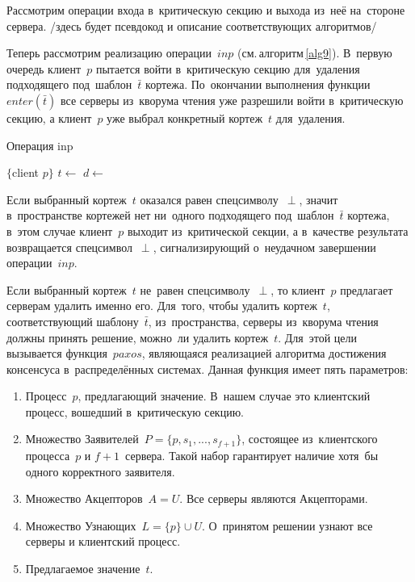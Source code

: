 Рассмотрим операции входа в~критическую секцию и выхода из~неё на~стороне сервера. /здесь будет псевдокод и описание соответствующих алгоритмов/

Теперь рассмотрим реализацию операции~$inp$ (см.\,алгоритм\,\ref{alg9}). В~первую очередь клиент~$p$ пытается войти в~критическую секцию для~удаления подходящего под~шаблон~$\bar t$ кортежа. По~окончании выполнения функции~$enter(\bar t)$ все серверы из~кворума чтения уже разрешили войти в~критическую секцию, а клиент~$p$ уже выбрал конкретный кортеж~$t$ для~удаления.

\begin{algorithm}[H]
	\caption{Операция inp}\label{alg9}
	\begin{algorithmic}[1]
		\Statex $\{$client $p \}$
		\Repeat
			\State $t \gets$ 
				\State {}
				\State \Return{$\perp$}
			\EndIf
			\State $d \gets$ 
			\State {}
		\State {}
		\EndFunction
	\end{algorithmic}
\end{algorithm}

Если выбранный кортеж~$t$ оказался равен спецсимволу~$\perp$, значит в~пространстве кортежей нет ни~одного подходящего под~шаблон~$\bar t$ кортежа, в~этом случае клиент~$p$ выходит из~критической секции, а в~качестве результата возвращается спецсимвол~$\perp$, сигнализирующий о~неудачном завершении операции~$inp$.

Если выбранный кортеж~$t$ не~равен спецсимволу~$\perp$, то клиент~$p$ предлагает серверам удалить именно его. Для~того, чтобы удалить кортеж~$t$, соответствующий шаблону~$\bar{t}$, из~пространства, серверы из~кворума чтения должны принять решение, можно~ли удалить кортеж~$t$. Для~этой цели вызывается функция~$paxos$, являющаяся реализацией алгоритма достижения консенсуса в~распределённых системах. Данная функция имеет пять параметров: 
\begin{enumerate}
	\item Процесс~$p$, предлагающий значение. В~нашем случае это клиентский процесс, вошедший в~критическую секцию.
	\item Множество Заявителей~$P = \{p, s_1, ..., s_{f+1}\}$, состоящее из~клиентского процесса~$p$ и $f + 1$~сервера. Такой набор гарантирует наличие хотя~бы одного корректного заявителя.
	\item Множество Акцепторов~$A = U$. Все серверы являются Акцепторами.
	\item Множество Узнающих~$L = \{p\} \cup U$. О~принятом решении узнают все серверы и клиентский процесс.
	\item Предлагаемое значение~$t$.
\end{enumerate}


